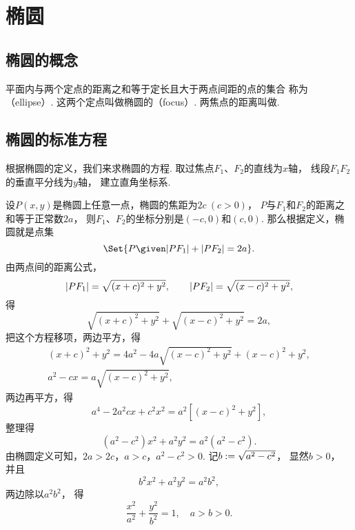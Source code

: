 \section{椭圆}
\subsection{椭圆的概念}
平面内与两个定点的距离之和等于定长且大于两点间距的点的集合
称为（ellipse）.
这两个定点叫做椭圆的（focus）.
两焦点的距离叫做.

\subsection{椭圆的标准方程}
根据椭圆的定义，我们来求椭圆的方程.
取过焦点\(F_1\)、\(F_2\)的直线为\(x\)轴，
线段\(F_1 F_2\)的垂直平分线为\(y\)轴，
建立直角坐标系.

设\(P(x,y)\)是椭圆上任意一点，椭圆的焦距为\(2c\ (c > 0)\)，
\(P\)与\(F_1\)和\(F_2\)的距离之和等于正常数\(2a\)，
则\(F_1\)、\(F_2\)的坐标分别是\((-c,0)\)和\((c,0)\).
那么根据定义，椭圆就是点集\begin{equation*}
	\Set{ P \given \LineSegmentLength{P F_1} + \LineSegmentLength{P F_2} = 2a }.
\end{equation*}
由两点间的距离公式，\begin{equation*}
	\abs{P F_1} = \sqrt{(x+c)^2+y^2}, \qquad
	\abs{P F_2} = \sqrt{(x-c)^2+y^2},
\end{equation*}
得\begin{equation*}
	\sqrt{(x+c)^2+y^2} + \sqrt{(x-c)^2+y^2} = 2a,
\end{equation*}
把这个方程移项，两边平方，得\begin{gather*}
	(x+c)^2+y^2 = 4a^2 - 4a\sqrt{(x-c)^2+y^2} + (x-c)^2+y^2, \\
	a^2 - cx = a\sqrt{(x-c)^2+y^2},
\end{gather*}
两边再平方，得\begin{equation*}
	a^4 - 2 a^2 cx + c^2 x^2 = a^2 [(x-c)^2+y^2],
\end{equation*}
整理得\begin{equation*}
	(a^2 - c^2) x^2 + a^2 y^2 = a^2 (a^2 - c^2).
\end{equation*}
由椭圆定义可知，\(2a > 2c\)，\(a > c\)，\(a^2 - c^2 > 0\).
记\(b := \sqrt{a^2 - c^2}\)，
显然\(b > 0\)，
并且\begin{equation*}
	b^2 x^2 + a^2 y^2 = a^2 b^2,
\end{equation*}
两边除以\(a^2 b^2\)，
得\begin{equation}\label{equation:平面解析几何.椭圆的标准方程1}
	\frac{x^2}{a^2} + \frac{y^2}{b^2} = 1,
	\quad a > b > 0.
\end{equation}

